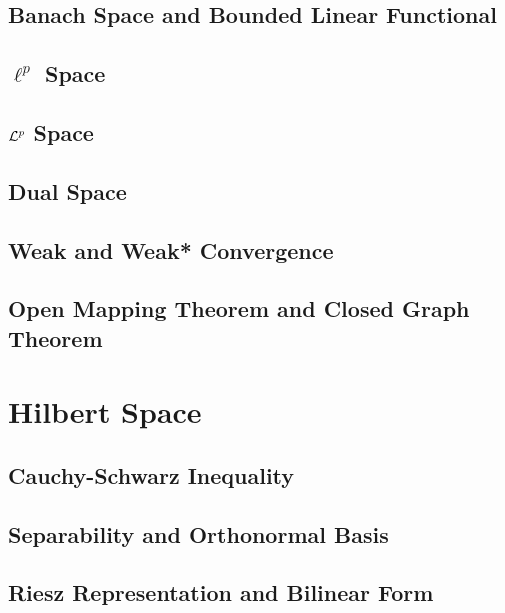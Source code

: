 \documentclass[a4paper, 12pt]{article}
\begin{document}
\subsection{Banach Space and Bounded Linear Functional}


\subsection{$\ell^p$ Space}


\subsection{$\mathcal{L}^p$ Space}


\subsection{Dual Space}


\subsection{Weak and Weak* Convergence}


\subsection{Open Mapping Theorem and Closed Graph Theorem}


\newpage
\section{Hilbert Space}

\subsection{Cauchy-Schwarz Inequality}


\subsection{Separability and Orthonormal Basis}


\subsection{Riesz Representation and Bilinear Form}

\end{document}
